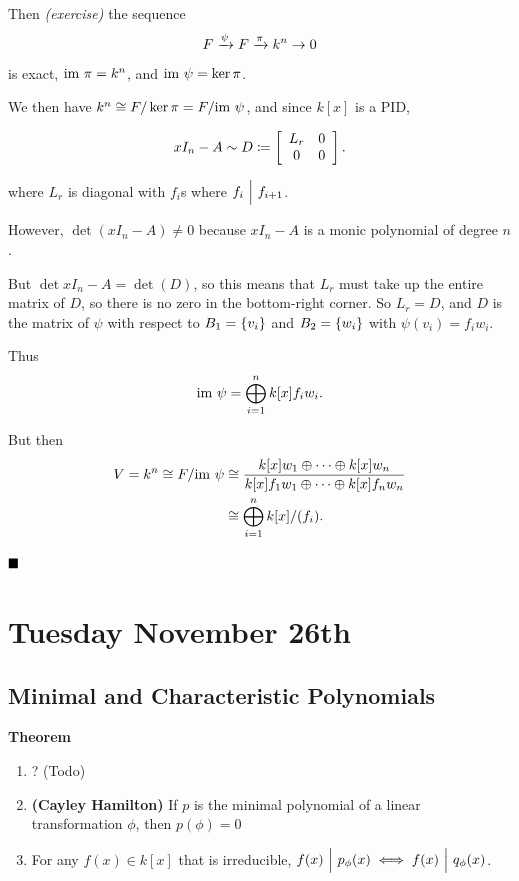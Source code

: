 Then \emph{(exercise)} the sequence \[
F \xrightarrow{\psi} F \xrightarrow{\pi} k^n \to 0
\] is exact, \({\text{im}~} \pi = k^n\), and \({\text{im}~} \psi = \ker \pi\).

We then have \(k^n \cong F/\ker \pi = F / {\text{im}~} \psi\), and since \(k[x]\)
is a PID,

\begin{align*}
xI_n - A \sim D \coloneqq
\left[\begin{array}{cc}
L_r & 0 \\
0 & 0
\end{array}\right]
.\end{align*}

where \(L_r\) is diagonal with \(f_i\)s where \(f_i {~\Bigm| ~} f_{i+1}\).

However, \(\det(xI_n - A) \neq 0\) because \(x I_n - A\) is a monic
polynomial of degree \(n\).

But \(\det{xI_n - A} = \det(D)\), so this means that \(L_r\) must take
up the entire matrix of \(D\), so there is no zero in the bottom-right
corner. So \(L_r = D\), and \(D\) is the matrix of \(\psi\) with respect
to \(B_1 = \left\{{v_i}\right\}\) and \(B_2 = \left\{{w_i}\right\}\) with
\(\psi(v_i) = f_i w_i\).

Thus \[
{\text{im}~} \psi = \bigoplus_{i=1}^n k[x] f_i w_i.
\]

But then \begin{align*}
V = k^n \cong F/ {\text{im}~} \psi
&\cong \frac{k[x] w_1 \oplus \cdots \oplus k[x] w_n} {k[x] f_1 w_1 \oplus \cdots \oplus k[x] f_n w_n} \\
&\cong \bigoplus_{i=1}^n k[x]/(f_i)
.\end{align*}

\(\qed\)

\hypertarget{tuesday-november-26th}{%
\section{Tuesday November 26th}\label{tuesday-november-26th}}

\hypertarget{minimal-and-characteristic-polynomials}{%
\subsection{Minimal and Characteristic
Polynomials}\label{minimal-and-characteristic-polynomials}}

\textbf{Theorem}

\begin{enumerate}
\def\labelenumi{\alph{enumi}.}
\item
  ? (Todo)
\item
  \textbf{(Cayley Hamilton)} If \(p\) is the minimal polynomial of a
  linear transformation \(\phi\), then \(p(\phi) = 0\)
\item
  For any \(f(x) \in k[x]\) that is irreducible,
  \(f(x) {~\Bigm| ~} p_\phi(x) \iff f(x) {~\Bigm| ~} q_\phi(x)\).
\end{enumerate}

